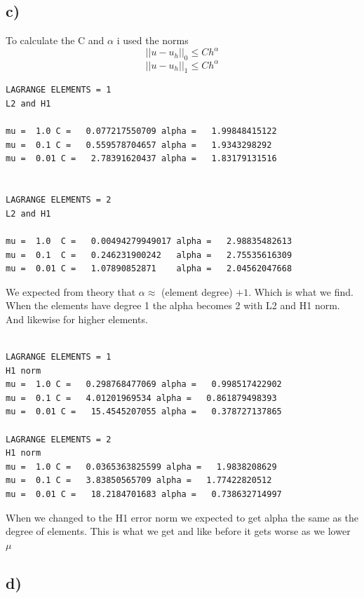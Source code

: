 \documentclass[a4paper,norsk]{article}
\begin{document}
\subsection*{c)}

To calculate the C and $\alpha$ i used the norms 
 $$ \vert \vert u-u_h \vert \vert_{0} \leq C h^\alpha  $$
 $$ \vert \vert u-u_h \vert \vert_{1} \leq C h^\alpha  $$

\begin{lstlisting}
LAGRANGE ELEMENTS = 1
L2 and H1

mu =  1.0 C =   0.077217550709 alpha =   1.99848415122
mu =  0.1 C =   0.559578704657 alpha =   1.9343298292
mu =  0.01 C =   2.78391620437 alpha =   1.83179131516


LAGRANGE ELEMENTS = 2
L2 and H1

mu =  1.0  C =   0.00494279949017 alpha =   2.98835482613
mu =  0.1  C =   0.246231900242   alpha =   2.75535616309
mu =  0.01 C =   1.07890852871    alpha =   2.04562047668

\end{lstlisting}
We expected from theory that $\alpha \approx $  (element degree)  $ +1$.\newline
Which is what we find. When the elements have degree 1 the alpha becomes 2 with L2 and H1 norm. And likewise for higher elements.
\begin{lstlisting}

LAGRANGE ELEMENTS = 1 
H1 norm
mu =  1.0 C =   0.298768477069 alpha =   0.998517422902
mu =  0.1 C =   4.01201969534 alpha =   0.861879498393
mu =  0.01 C =   15.4545207055 alpha =   0.378727137865

LAGRANGE ELEMENTS = 2
H1 norm
mu =  1.0 C =   0.0365363825599 alpha =   1.9838208629
mu =  0.1 C =   3.83850565709 alpha =   1.77422820512
mu =  0.01 C =   18.2184701683 alpha =   0.738632714997
\end{lstlisting}

When we changed to the H1 error norm we expected to get alpha the same as the degree of elements. This is what we get and like before it gets worse as we lower $\mu$


\subsection*{d)}
\end{document}
